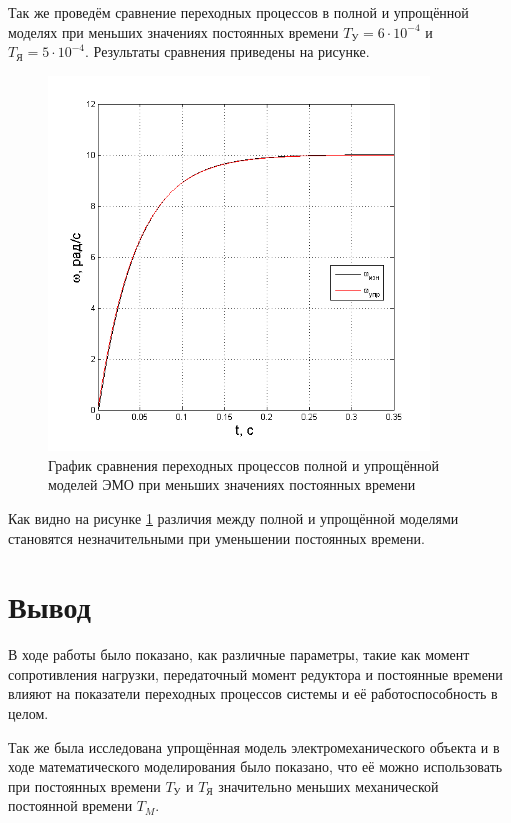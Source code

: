 \documentclass[fleqn, a4paper, 11pt, russian]{article}
\begin{document}
	Так же проведём сравнение переходных процессов в полной и упрощённой моделях при меньших значениях постоянных времени $T_\text{У} = 6\cdot10^{-4}$ и $T_\text{Я} = 5\cdot10^{-4}$. Результаты сравнения приведены на рисунке.
	\begin{figure}[ht!]
		\centering
		\includegraphics[width = 0.9\textwidth]{simpTvar}
		\caption{График сравнения переходных процессов полной и упрощённой моделей ЭМО при меньших значениях постоянных времени}
		\label{simpTvar}
	\end{figure}
	\newpage
	Как видно на рисунке \ref{simpTvar} различия между полной и упрощённой моделями становятся незначительными при уменьшении постоянных времени.
	\clearpage
	\section*{Вывод}
	В ходе работы было показано, как различные параметры, такие как момент сопротивления нагрузки, передаточный момент редуктора и постоянные времени влияют на показатели переходных процессов системы и её работоспособность в целом.
	
	Так же была исследована упрощённая модель электромеханического объекта и в ходе математического моделирования было показано, что её можно использовать при постоянных времени $T_\text{У}$ и $T_\text{Я}$ значительно меньших механической постоянной времени $T_M$.
\end{document}
